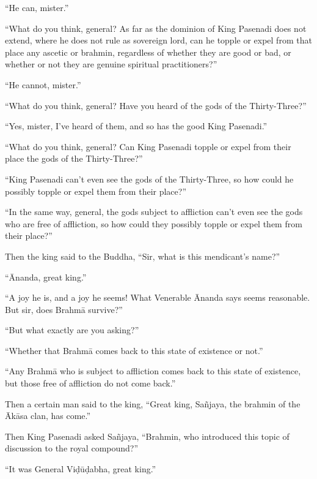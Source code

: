 \documentclass[12pt,openany]{book}%
\begin{document}
“He can, mister.” 

“What do you think, general? As far as the dominion of King Pasenadi does not extend, where he does not rule as sovereign lord, can he topple or expel from that place any ascetic or brahmin, regardless of whether they are good or bad, or whether or not they are genuine spiritual practitioners?” 

“He cannot, mister.” 

“What do you think, general? Have you heard of the gods of the Thirty-Three?” 

“Yes, mister, I’ve heard of them, and so has the good King Pasenadi.” 

“What do you think, general? Can King Pasenadi topple or expel from their place the gods of the Thirty-Three?” 

“King Pasenadi can’t even see the gods of the Thirty-Three, so how could he possibly topple or expel them from their place?” 

“In the same way, general, the gods subject to affliction can’t even see the gods who are free of affliction, so how could they possibly topple or expel them from their place?” 

Then the king said to the Buddha, “Sir, what is this mendicant’s name?” 

“Ānanda, great king.” 

“A joy he is, and a joy he seems! What Venerable Ānanda says seems reasonable. But sir, does \textsanskrit{Brahmā} survive?” 

“But what exactly are you asking?” 

“Whether that \textsanskrit{Brahmā} comes back to this state of existence or not.” 

“Any \textsanskrit{Brahmā} who is subject to affliction comes back to this state of existence, but those free of affliction do not come back.” 

Then a certain man said to the king, “Great king, \textsanskrit{Sañjaya}, the brahmin of the \textsanskrit{Ākāsa} clan, has come.” 

Then King Pasenadi asked \textsanskrit{Sañjaya}, “Brahmin, who introduced this topic of discussion to the royal compound?” 

“It was General \textsanskrit{Viḍūḍabha}, great king.” 
\end{document}
